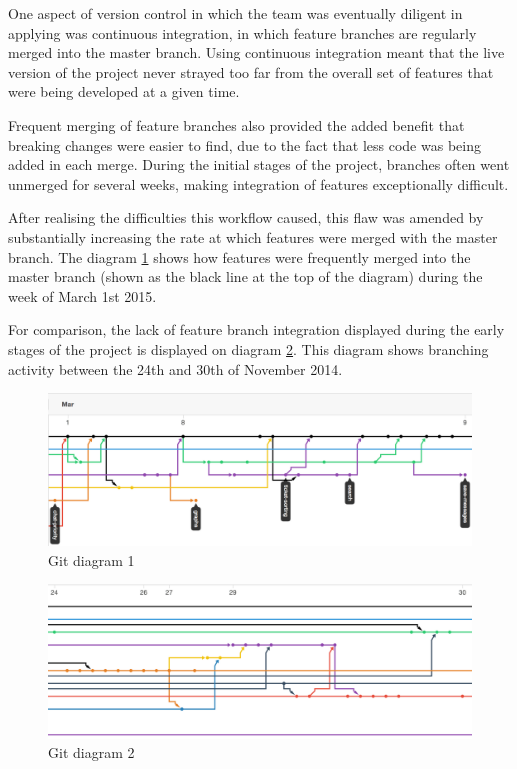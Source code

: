 \documentclass[a4paper]{l3proj}
\begin{document}
One aspect of version control in which the team was eventually diligent in applying was continuous integration, in which feature branches are regularly merged into the master branch. Using continuous integration meant that the live version of the project never strayed too far from the overall set of features that were being developed at a given time. 

Frequent merging of feature branches also provided the added benefit that breaking changes were easier to find, due to the fact that less code was being added in each merge. During the initial stages of the project, branches often went unmerged for several weeks, making integration of features exceptionally difficult. 

After realising the difficulties this workflow caused, this flaw was amended by substantially increasing the rate at which features were merged with the master branch. The diagram \ref{figure:diagram1} shows how features were frequently merged into the master branch (shown as the black line at the top of the diagram) during the week of March 1st 2015.

For comparison, the lack of feature branch integration displayed during the early stages of the project is displayed on diagram \ref{figure:diagram2}. This diagram shows branching activity between the 24th and 30th of November 2014. 

\begin{figure}[ht, ref={\alph}]
\centering
\includegraphics[scale=0.5]{diagram}
\caption{Git diagram 1}
\label{figure:diagram1}
\end{figure} 

\begin{figure}[ht, ref={\alph}]
\centering
\includegraphics[scale=0.5]{diagram2}
\caption{Git diagram 2}
\label{figure:diagram2}
\end{figure} 
\end{document}
